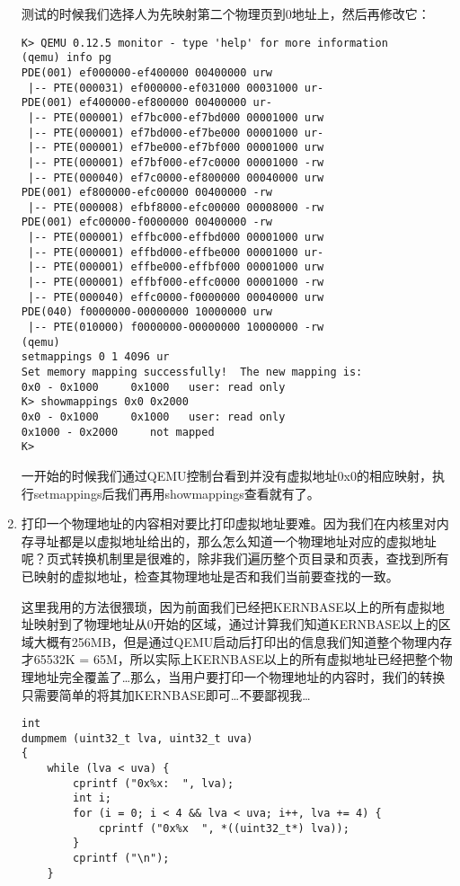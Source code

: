 \documentclass{article}
\begin{document}
\begin{CJK*}{UTF8}{gkai}
\begin{enumerate}
{测试的时候我们选择人为先映射第二个物理页到0地址上，然后再修改它：

\begin{lstlisting}[style=console]
K> QEMU 0.12.5 monitor - type 'help' for more information
(qemu) info pg
PDE(001) ef000000-ef400000 00400000 urw
 |-- PTE(000031) ef000000-ef031000 00031000 ur-
PDE(001) ef400000-ef800000 00400000 ur-
 |-- PTE(000001) ef7bc000-ef7bd000 00001000 urw
 |-- PTE(000001) ef7bd000-ef7be000 00001000 ur-
 |-- PTE(000001) ef7be000-ef7bf000 00001000 urw
 |-- PTE(000001) ef7bf000-ef7c0000 00001000 -rw
 |-- PTE(000040) ef7c0000-ef800000 00040000 urw
PDE(001) ef800000-efc00000 00400000 -rw
 |-- PTE(000008) efbf8000-efc00000 00008000 -rw
PDE(001) efc00000-f0000000 00400000 -rw
 |-- PTE(000001) effbc000-effbd000 00001000 urw
 |-- PTE(000001) effbd000-effbe000 00001000 ur-
 |-- PTE(000001) effbe000-effbf000 00001000 urw
 |-- PTE(000001) effbf000-effc0000 00001000 -rw
 |-- PTE(000040) effc0000-f0000000 00040000 urw
PDE(040) f0000000-00000000 10000000 urw
 |-- PTE(010000) f0000000-00000000 10000000 -rw
(qemu) 
setmappings 0 1 4096 ur
Set memory mapping successfully!  The new mapping is:
0x0 - 0x1000     0x1000   user: read only
K> showmappings 0x0 0x2000
0x0 - 0x1000     0x1000   user: read only
0x1000 - 0x2000     not mapped
K> 

\end{lstlisting}

一开始的时候我们通过QEMU控制台看到并没有虚拟地址0x0的相应映射，执行setmappings后我们再用showmappings查看就有了。

}

\item{ 打印一个物理地址的内容相对要比打印虚拟地址要难。因为我们在内核里对内存寻址都是以虚拟地址给出的，那么怎么知道一个物理地址对应的虚拟地址呢？页式转换机制里是很难的，除非我们遍历整个页目录和页表，查找到所有已映射的虚拟地址，检查其物理地址是否和我们当前要查找的一致。

这里我用的方法很猥琐，因为前面我们已经把KERNBASE以上的所有虚拟地址映射到了物理地址从0开始的区域，通过计算我们知道KERNBASE以上的区域大概有256MB，但是通过QEMU启动后打印出的信息我们知道整个物理内存才65532K = 65M，所以实际上KERNBASE以上的所有虚拟地址已经把整个物理地址完全覆盖了\ldots 那么，当用户要打印一个物理地址的内容时，我们的转换只需要简单的将其加KERNBASE即可\ldots 不要鄙视我\ldots

\begin{lstlisting}[style=ccode, title={\scriptsize \ttfamily \bfseries kern/pmap.c}]
int
dumpmem (uint32_t lva, uint32_t uva)
{
    while (lva < uva) {
        cprintf ("0x%x:  ", lva);
        int i;
        for (i = 0; i < 4 && lva < uva; i++, lva += 4) {
            cprintf ("0x%x  ", *((uint32_t*) lva));
        }
        cprintf ("\n");
    }


\end{lstlisting}}
\end{enumerate}
\end{CJK*}
\end{document}

